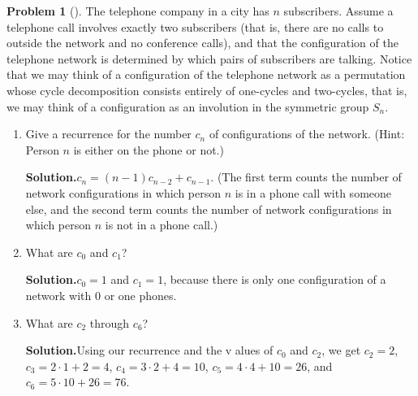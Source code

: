 \documentclass[10pt,]{book}
\theoremstyle{plain}
\theoremstyle{definition}
\newtheorem{activity}[project]{Problem}
\theoremstyle{definition}
\numberwithin{equation}{chapter}
\begin{document}
\begin{activity}[]\label{telephonenetwork}
The telephone company in a city has \(n\) subscribers. Assume a telephone call involves exactly two subscribers (that is, there are no calls to outside the network and no conference calls), and that the configuration of the telephone network is determined by which pairs of subscribers are talking. Notice that we may think of a configuration of the telephone network as a permutation whose cycle decomposition consists entirely of one-cycles and two-cycles, that is, we may think of a configuration as an involution in the symmetric group \(S_n\).%
\begin{enumerate}[font=\bfseries,label=(\alph*),ref=\alph*]
\item\label{task-255} Give a recurrence for the number \(c_n\) of configurations of the network. (Hint: Person \(n\) is either on  the phone or not.)%
\par\medskip\noindent%
\textbf{Solution.}\quad \(c_n =(n-1)c_{n-2} + c_{n-1}\). (The first term counts the number of network configurations in which person \(n\) is in a phone call with someone else, and the second term counts the number of network configurations in which person \(n\) is not in a phone call.)%
\item\label{task-256} What are \(c_0\) and \(c_1\)?%
\par\medskip\noindent%
\textbf{Solution.}\quad \(c_0 =1\) and \(c_1=1\), because there is only one configuration of a network with 0 or one phones.%
\item\label{task-257} What are \(c_2\) through \(c_6\)?%
\par\medskip\noindent%
\textbf{Solution.}\quad Using our recurrence and the v alues of \(c_0\) and \(c_2\), we get \(c_2 =2\), \(c_3 =2\cdot1 +2=4\), \(c_4= 3\cdot2+4=10\), \(c_5= 4\cdot4 +10 = 26\), and \(c_6 = 5\cdot 10+26=76\).%
\end{enumerate}
\end{activity}
\end{document}
